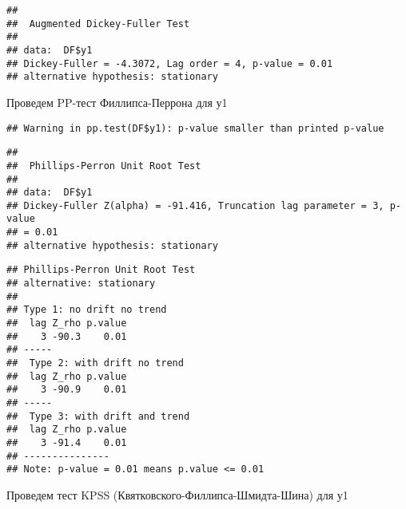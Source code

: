 \documentclass[
]{article}
\newenvironment{Shaded}{\begin{snugshade}}{\end{snugshade}}
\newcommand{\AttributeTok}[1]{\textcolor[rgb]{0.13,0.29,0.53}{#1}}
\newcommand{\CommentTok}[1]{\textcolor[rgb]{0.56,0.35,0.01}{\textit{#1}}}
\newcommand{\FunctionTok}[1]{\textcolor[rgb]{0.13,0.29,0.53}{\textbf{#1}}}
\newcommand{\NormalTok}[1]{#1}
\newcommand{\SpecialCharTok}[1]{\textcolor[rgb]{0.81,0.36,0.00}{\textbf{#1}}}
\newcommand{\StringTok}[1]{\textcolor[rgb]{0.31,0.60,0.02}{#1}}
\begin{document}
\begin{verbatim}
## 
##  Augmented Dickey-Fuller Test
## 
## data:  DF$y1
## Dickey-Fuller = -4.3072, Lag order = 4, p-value = 0.01
## alternative hypothesis: stationary
\end{verbatim}

\begin{Shaded}
\end{Shaded}

Проведем PP-тест Филлипса-Перрона для у1

\begin{Shaded}
\end{Shaded}

\begin{verbatim}
## Warning in pp.test(DF$y1): p-value smaller than printed p-value
\end{verbatim}

\begin{verbatim}
## 
##  Phillips-Perron Unit Root Test
## 
## data:  DF$y1
## Dickey-Fuller Z(alpha) = -91.416, Truncation lag parameter = 3, p-value
## = 0.01
## alternative hypothesis: stationary
\end{verbatim}

\begin{Shaded}
\end{Shaded}

\begin{verbatim}
## Phillips-Perron Unit Root Test 
## alternative: stationary 
##  
## Type 1: no drift no trend 
##  lag Z_rho p.value
##    3 -90.3    0.01
## ----- 
##  Type 2: with drift no trend 
##  lag Z_rho p.value
##    3 -90.9    0.01
## ----- 
##  Type 3: with drift and trend 
##  lag Z_rho p.value
##    3 -91.4    0.01
## --------------- 
## Note: p-value = 0.01 means p.value <= 0.01
\end{verbatim}

Проведем тест KPSS (Квятковского-Филлипса-Шмидта-Шина) для у1
\end{document}
